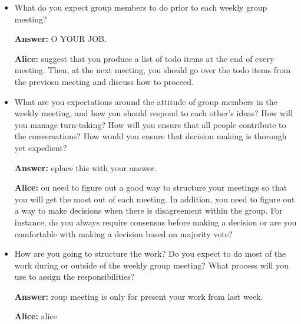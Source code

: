 \documentclass[12pt]{article}
\newenvironment{answer}[1]{
\color{blue}
	{\bf Answer:}
}{
}
\newenvironment{alice}[1]{
\color{magenta}
	{\bf Alice:}
}{
}
\begin{document}
\begin{itemize}
\begin{answer}
Zoom
\end{answer}

\item What do you expect group members to do prior to each weekly group meeting? 

\begin{answer}

DO YOUR JOB.
\end{answer}

\begin{alice}

I suggest that you produce a list of todo items at the end of every meeting.  Then, at the next meeting, you should go over the todo items from the previosu meeting and discuss how to proceed. 

\end{alice}


\item What are you expectations around the attitude of group members in the weekly meeting, and how you should respond to each other’s ideas?  How will you manage turn-taking? How will you ensure that all people contribute to the conversations? How would you ensure that decision making is thorough yet expedient?

\begin{answer}

Replace this with your answer.
\end{answer}

\begin{alice}

You need to figure out a good way to structure your meetings so that you will get the most out of each meeting.  In addition, you need to figure out a way to make decisions when there is disagreement within the group.  For instance, do you always require consensus before making a decision or are you comfortable with making a decision based on majority vote?  
\end{alice}

\item How are you going to structure the work? Do you expect to do most of the work during or outside of the weekly group meeting? What process will you use to assign the responsibilities?

\begin{answer}

Group meeting is only for present your work from last week.
\end{answer}

\begin{alice}


\end{alice}
\end{itemize}
\end{document}
